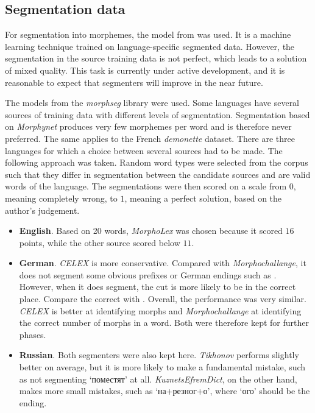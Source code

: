 \subsection{Segmentation data}\label{sec:preprocess_segmentation}

For segmentation into morphemes, the model from \textcite{John2026} was used. It is a machine learning technique trained on language-specific segmented data. However, the segmentation in the source training data is not perfect, which leads to a solution of mixed quality. This task is currently under active development, and it is reasonable to expect that segmenters will improve in the near future.

The models from the \textit{morphseg} library were used. Some languages have several sources of training data with different levels of segmentation. Segmentation based on \textit{Morphynet} produces very few morphemes per word and is therefore never preferred. The same applies to the French \textit{demonette} dataset. There are three languages for which a choice between several sources had to be made. The following approach was taken. Random word types were selected from the corpus such that they differ in segmentation between the candidate sources and are valid words of the language. The segmentations were then scored on a scale from $0$, meaning completely wrong, to $1$, meaning a perfect solution, based on the author's judgement.

\begin{itemize}
    \item \textbf{English}. Based on 20 words, \textit{MorphoLex} was chosen because it scored $16$ points, while the other source scored below $11$.
    \item \textbf{German}. \textit{CELEX} is more conservative. Compared with \textit{Morphochallange}, it does not segment some obvious prefixes or German endings such as . However, when it does segment, the cut is more likely to be in the correct place. Compare the correct  with . Overall, the performance was very similar. \textit{CELEX} is better at identifying morphs and \textit{Morphochallange} at identifying the correct number of morphs in a word. Both were therefore kept for further phases.
    \item \textbf{Russian}. Both segmenters were also kept here. \textit{Tikhonov} performs slightly better on average, but it is more likely to make a fundamental mistake, such as not segmenting `\textrussian{поместят}' at all. \textit{KuznetsEfremDict}, on the other hand, makes more small mistakes, such as `\textrussian{на+резног+о}', where `\textrussian{ого}' should be the ending.
\end{itemize}


